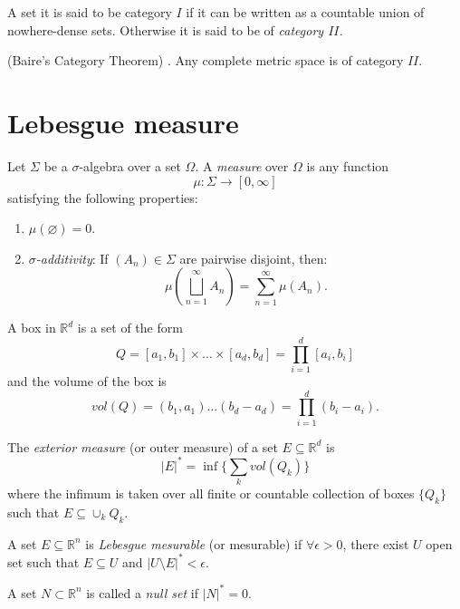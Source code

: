 \documentclass[../main.tex]{subfiles}
\begin{document}
\begin{definition}
	A set it is said to be category $I$ if it can be written as a countable union of nowhere-dense sets. Otherwise it is said to be of \emph{category $II$.}
\end{definition}
\begin{theorem} (Baire's Category Theorem) \cite{bach}. \label{baire}Any complete metric space is of category $II$. 
\end{theorem}


\section{Lebesgue measure}


\begin{definition}
	Let $\Sigma$ be a $\sigma$-algebra over a set $\Omega$. A \emph{measure} over $\Omega$ is any function $$\mu:\Sigma\longrightarrow[0,\infty]$$ satisfying the following properties:
	\begin{enumerate}
		\item $\mu(\varnothing)=0$.
		\item\label{RFA:sigmaadditivity} \emph{$\sigma$-additivity}: If $(A_n)\in\Sigma$ are pairwise disjoint, then: $$\mu\left(\bigsqcup_{n=1}^\infty A_n\right)=\sum_{n=1}^\infty \mu(A_n).$$
	\end{enumerate}
\end{definition}

\begin{definition} A box in $\mathbb{R}^d$ is a set of the form 
	$$ Q = [a_1,b_1]  \times ... \times [a_d,b_d] = \prod_{i=1}^d [a_i,b_i]$$
	and the volume of the box is $$ vol(Q)= (b_1,a_1) ... (b_d-a_d)= \prod_{i=1}^d (b_i-a_i).$$
	\end{definition}
\begin{definition}
	The \emph{exterior measure} (or outer measure) of a set $E\subseteq \mathbb{R}^d$ is $$ |E|^* = \inf\{\sum_k vol(Q_k)\} $$ 
	where the infimum is taken over all finite or countable collection of boxes $\{Q_k\}$ such that $E \subseteq \cup_k Q_k.$
\end{definition}

\begin{definition}
A set $E\subseteq \mathbb{R}^n $ is \emph{Lebesgue mesurable} (or mesurable) if $\forall \epsilon >0$, there exist $U$ open set such that $E \subseteq U$ and $|U\setminus E|^* < \epsilon.$
\end{definition}

\begin{definition}
A set $N \subset \mathbb{R}^n $ is called a \textit{null set }if $|N|^*=0.$
\end{definition}
\end{document}
